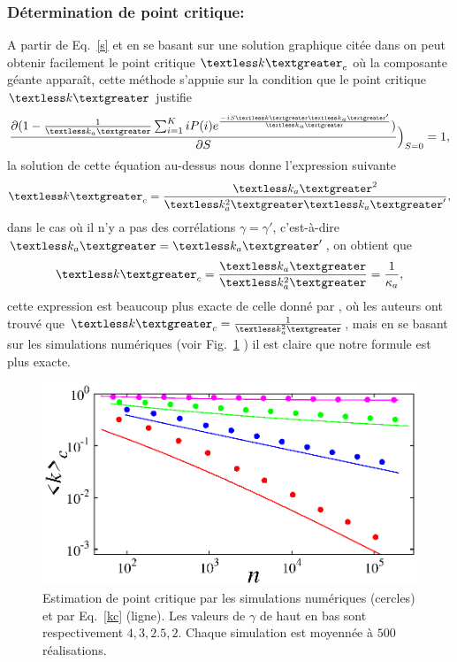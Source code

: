  \subsubsection{Détermination de point critique:}
 A partir de Eq.~\eqref{s} et en se basant sur une solution graphique citée dans \cite{Newman2010-403} on peut obtenir facilement le point critique $\km_c$ où la composante géante apparaît, cette méthode s'appuie sur la condition que le point critique $\km$ justifie  
 \begin{equation}
 \frac{\partial (1-\frac{1}{\kma}\sum_{i=1}^KiP(i)e^{\frac{-iS\km\kma'}{\kma}})}{\partial S}\Big)_{S=0}=1,
 \end{equation}
 la solution de cette équation au-dessus nous donne l'expression suivante
 \begin{equation}
\km_c=\frac{\kma^2}{\kmaa\kma'},
 \end{equation}
 dans le cas où il n'y a pas des corrélations $\gamma=\gamma'$, c'est-à-dire $\kma=\kma'$, on obtient que
  \begin{equation}
  \km_c=\frac{\kma}{\kmaa}=\frac{1}{\kappa_a},
  \label{kc}
  \end{equation}
   cette expression est beaucoup plus exacte de celle donné par \cite{Cho-al2010}, où les auteurs ont trouvé que $\km_c=\frac{1}{\kmaa}$, mais en se basant sur les simulations numériques (voir Fig.~\ref{PC} ) il est claire que notre formule est plus exacte.\\
\begin{figure}[h!]
	\centering
	\includegraphics[scale=1.2]{./figures/fig-PC}
	\caption{Estimation de point critique par les simulations numériques (cercles) et par Eq.~\eqref{kc} (ligne). Les valeurs de $\gamma$ de haut en bas sont respectivement $4,3,2.5,2$. Chaque simulation est moyennée à $500$ réalisations. }
	\label{PC}
\end{figure}

